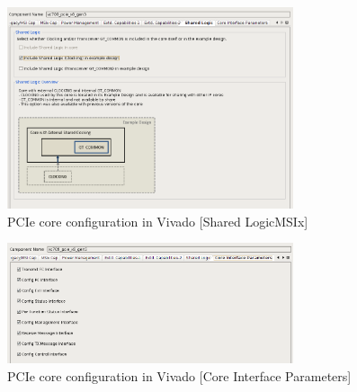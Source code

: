 \begin{figure}[H]
\centering
\includegraphics[width=0.75\textwidth]{pictures/pcie_core_shared.png}
\caption{PCIe core configuration in Vivado [Shared LogicMSIx]}
\label{fig:pcie_core_config10}
\end{figure}
\newpage
\begin{figure}[H]
\centering
\includegraphics[width=0.75\textwidth]{pictures/pcie_core_coreintpar.png}
\caption{PCIe core configuration in Vivado [Core Interface Parameters]}
\label{fig:pcie_core_config11}
\end{figure}
\newpage